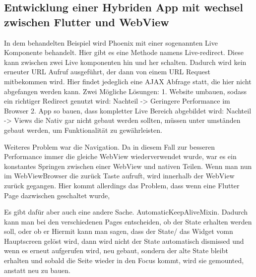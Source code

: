 
\subsection{Entwicklung einer Hybriden App mit wechsel zwischen Flutter und WebView}
In dem behandelten Beispiel wird Phoenix mit einer sogenannten Live Komponente behandelt. Hier gibt es eine Methode namens Live-redirect. Diese kann zwischen zwei Live komponenten hin und her schalten. Dadurch wird kein erneuter URL Aufruf ausgeführt, der dann von einem URL Request mitbekommen wird. Hier findet jedeglich eine AJAX Abfrage statt, die hier nicht abgefangen werden kann.
Zwei Mögliche Lösungen:
1. Website umbauen, sodass ein richtiger Redirect genutzt wird: Nachteil -> Geringere Performance im Browser
2. App so bauen, dass kompletter Live Bereich abgebildet wird: Nachteil -> Views die Nativ gar nicht gebaut werden sollten, müssen unter umständen gebaut werden, um Funktionalität zu gewährleisten.

Weiteres Problem war die Navigation. Da in diesem Fall zur besseren Performance immer die gleiche WebView wiederverwendet wurde, war es ein konstantes Springen zwischen einer WebView und nativen Teilen. Wenn man nun im WebViewBrowser die zurück Taste aufruft, wird innerhalb der WebView zurück gegangen. Hier kommt allerdings das Problem, dass wenn eine Flutter Page dazwischen geschaltet wurde, 

Es gibt dafür aber auch eine andere Sache. AutomaticKeepAliveMixin.
Dadurch kann man bei den verschiedenen Pages entscheiden, ob der State erhalten werden soll, oder ob er 
Hiermit kann man sagen, dass der State/ das Widget vomn Hauptscreen gelöst wird, dann wird nicht der State automatisch dismissed und wenn es erneut aufgerufen wird, neu gebaut, sondern der alte State bleibt erhalten und sobald die Seite wieder in den Focus kommt, wird sie gemounted, anstatt neu zu bauen.